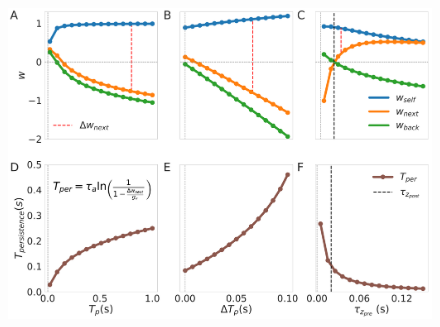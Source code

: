 \documentclass[10pt,a4paper]{article}
\begin{document}
\begin{figure}[H]
\centering
\includegraphics[scale=0.20]{training.pdf}

\end{figure}
\end{document}
